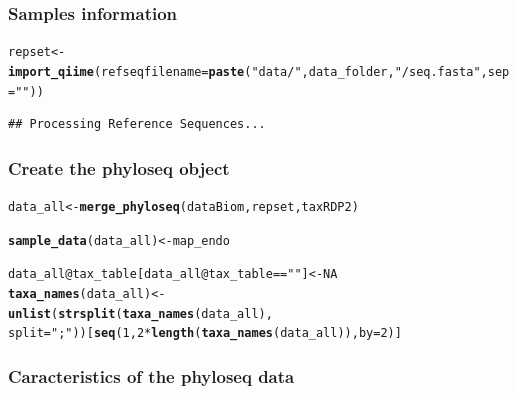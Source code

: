 \documentclass[12pt]{article}\usepackage[]{graphicx}\usepackage[]{color}
\makeatletter
\newcommand{\hlnum}[1]{\textcolor[rgb]{0.686,0.059,0.569}{#1}}%
\newcommand{\hlstr}[1]{\textcolor[rgb]{0.192,0.494,0.8}{#1}}%
\newcommand{\hlopt}[1]{\textcolor[rgb]{0,0,0}{#1}}%
\newcommand{\hlstd}[1]{\textcolor[rgb]{0.345,0.345,0.345}{#1}}%
\newcommand{\hlkwb}[1]{\textcolor[rgb]{0.69,0.353,0.396}{#1}}%
\newcommand{\hlkwc}[1]{\textcolor[rgb]{0.333,0.667,0.333}{#1}}%
\newcommand{\hlkwd}[1]{\textcolor[rgb]{0.737,0.353,0.396}{\textbf{#1}}}%
\newenvironment{kframe}{%
 \def\at@end@of@kframe{}%
 \ifinner\ifhmode%
  \def\at@end@of@kframe{\end{minipage}}%
  \begin{minipage}{\columnwidth}%
 \fi\fi%
 \def\FrameCommand##1{\hskip\@totalleftmargin \hskip-\fboxsep
 \colorbox{shadecolor}{##1}\hskip-\fboxsep
     \hskip-\linewidth \hskip-\@totalleftmargin \hskip\columnwidth}%
 \MakeFramed {\advance\hsize-\width
   \@totalleftmargin\z@ \linewidth\hsize
   \@setminipage}}%
 {\par\unskip\endMakeFramed%
 \at@end@of@kframe}
\newenvironment{knitrout}{}{} %
\numberwithin{figure}{section}
\makeatother
\begin{document}
 \subsubsection{Samples information}
\begin{knitrout}\small
{}\color{fgcolor}\begin{kframe}
\begin{alltt}
\hlstd{repset} \hlkwb{<-} \hlkwd{import_qiime}\hlstd{(}\hlkwc{refseqfilename} \hlstd{=} \hlkwd{paste}\hlstd{(}\hlstr{"data/"}\hlstd{, data_folder,} \hlstr{"/seq.fasta"}\hlstd{,} \hlkwc{sep}\hlstd{=}\hlstr{""}\hlstd{))}
\end{alltt}
\begin{verbatim}
## Processing Reference Sequences...
\end{verbatim}
\end{kframe}
\end{knitrout}

 \subsubsection{Create the phyloseq object}

\begin{knitrout}\small
{}\color{fgcolor}\begin{kframe}
\begin{alltt}
\hlstd{data_all} \hlkwb{<-} \hlkwd{merge_phyloseq}\hlstd{(dataBiom, repset, taxRDP2)}

\hlkwd{sample_data}\hlstd{(data_all)} \hlkwb{<-} \hlstd{map_endo}

\hlstd{data_all}\hlopt{@}\hlkwc{tax_table}\hlstd{[data_all}\hlopt{@}\hlkwc{tax_table} \hlopt{==} \hlstr{""}\hlstd{]} \hlkwb{<-} \hlnum{NA}
\hlkwd{taxa_names}\hlstd{(data_all)} \hlkwb{<-}
  \hlkwd{unlist}\hlstd{(}\hlkwd{strsplit}\hlstd{(}\hlkwd{taxa_names}\hlstd{(data_all) ,}
                  \hlkwc{split}\hlstd{=}\hlstr{";"}\hlstd{))[}\hlkwd{seq}\hlstd{(}\hlnum{1}\hlstd{,} \hlnum{2}\hlopt{*}\hlkwd{length}\hlstd{(}\hlkwd{taxa_names}\hlstd{(data_all)),} \hlkwc{by}\hlstd{=}\hlnum{2}\hlstd{)]}
\end{alltt}
\end{kframe}
\end{knitrout}

\subsubsection{Caracteristics of the phyloseq data}
  
\end{document}
